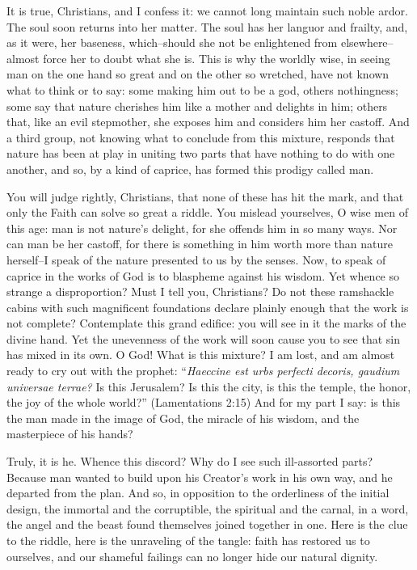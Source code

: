 \documentclass[10pt, twoside]{article}
\begin{document}
It is true, Christians, and I confess it: we cannot long maintain such noble ardor. The soul soon returns into her matter. The soul has her languor and frailty, and, as it were, her baseness, which--should she not be enlightened from elsewhere--almost force her to doubt what she is. This is why the worldly wise, in seeing man on the one hand so great and on the other so wretched, have not known what to think or to say: some making him out to be a god, others nothingness; some say that nature cherishes him like a mother and delights in him; others that, like an evil stepmother, she exposes him and considers him her castoff. And a third group, not knowing what to conclude from this mixture, responds that nature has been at play in uniting two parts that have nothing to do with one another, and so, by a kind of caprice, has formed this prodigy called man.

You will judge rightly, Christians, that none of these has hit the mark, and that only the Faith can solve so great a riddle. You mislead yourselves, O wise men of this age: man is not nature's delight, for she offends him in so many ways. Nor can man be her castoff, for there is something in him worth more than nature herself--I speak of the nature presented to us by the senses. Now, to speak of caprice in the works of God is to blaspheme against his wisdom. Yet whence so strange a disproportion? Must I tell you, Christians? Do not these ramshackle cabins with such magnificent foundations declare plainly enough that the work is not complete? Contemplate this grand edifice: you will see in it the marks of the divine hand. Yet the unevenness of the work will soon cause you to see that sin has mixed in its own. O God! What is this mixture? I am lost, and am almost ready to cry out with the prophet: ``\textit{Haeccine est urbs perfecti decoris, gaudium universae terrae?} Is this Jerusalem? Is this the city, is this the temple, the honor, the joy of the whole world?'' (Lamentations 2:15) And for my part I say: is this the man made in the image of God, the miracle of his wisdom, and the masterpiece of his hands?

Truly, it is he. Whence this discord? Why do I see such ill-assorted parts? Because man wanted to build upon his Creator's work in his own way, and he departed from the plan. And so, in opposition to the orderliness of the initial design, the immortal and the corruptible, the spiritual and the carnal, in a word, the angel and the beast found themselves joined together in one. Here is the clue to the riddle, here is the unraveling of the tangle: faith has restored us to ourselves, and our shameful failings can no longer hide our natural dignity.
\end{document}

